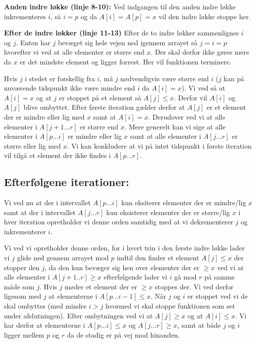 \documentclass[10pt,a4paper,danish]{article}
\begin{document}
\textbf{Anden indre løkke (linje 8-10):}
Ved indgangen til den anden indre løkke inkrementeres $i$, så $i=p$ og da $A[i] = A[p] = x$ vil den indre løkke stoppe her.

\textbf{Efter de indre løkker (linje 11-13)}
Efter de to indre løkker sammenlignes $i$ og $j$.
Enten har $j$ bevæget sig hele vejen ned igennem arrayet så $j=i=p$ hvorefter vi ved at alle elementer er større end $x$. Der skal derfor ikke gøres mere da $x$ er det mindste element og ligger forrest. Her vil funktionen terminere.

Hvis $j$ i stedet er forskellig fra $i$, må $j$ nødvendigvis være større end $i$ ($j$ kan på nuværende tidspunkt ikke være mindre end $i$ da $A[i] = x$).
Vi ved så at $A[i] = x$ og at $j$ er stoppet på et element så $A[j] \leq x$. Derfor vil $A[i]$ og $A[j]$ blive ombyttet.
Efter første iteration gælder derfor at $A[j]$ er et element der er mindre eller lig med $x$ samt at $A[i] = x$. Derudover ved vi at alle elementer i $A[j+1 \ldots r]$ er større end $x$.
Mere generelt kan vi sige at alle elementer i $A[p \ldots i]$ er mindre eller lig $x$ samt at alle elementer i $A[j \ldots r]$ er større eller lig med $x$.
Vi kan konkludere at vi på intet tidspunkt i første iteration vil tilgå et element der ikke findes i $A[p \ldots r]$.

\subsection{Efterfølgene iterationer:}
\label{sec:eft-it}
Vi ved nu at der i intervallet $A[p \ldots i]$ kun eksiterer elementer der er mindre/lig $x$ samt at der i intervallet $A[j \ldots r]$ kun eksisterer elementer der er større/lig $x$
i hver iteration opretholder vi denne orden samtidig med at vi dekrementerer $j$ og inkrementerer $i$.

Vi ved vi opretholder denne orden, for i hvert trin i den første indre løkke lader vi $j$ glide ned gennem arrayet mod $p$ indtil den finder et element $A[j] \leq x$ der stopper den $j$, da den kun bevæger sig hen over elementer der er $\geq x$ ved vi at alle elementer i $A[j+1..r] \geq x$
efterfølgende lader vi $i$ gå mod $r$ på samme måde som $j$. Hvis $j$ møder et element der er $\geq x$ stoppes der. Vi ved derfor ligesom med $j$ at elementerne i $A[p \ldots i-1] \leq x$. Når $j$ og $i$ er stoppet ved vi de skal ombyttes (med mindre $i>j$ hvormed vi skal stoppe funktionen som set under afslutningen). Efter ombytningen ved vi at $A[j] \geq x$ og at $A[i] \leq x$. Vi har derfor at elementerne i $A[p \ldots i] \leq x$ og $A[j \ldots r] \geq x$, samt at både $j$ og $i$ ligger mellem $p$ og $r$ da de stadig er på vej mod hinanden.
\end{document}
